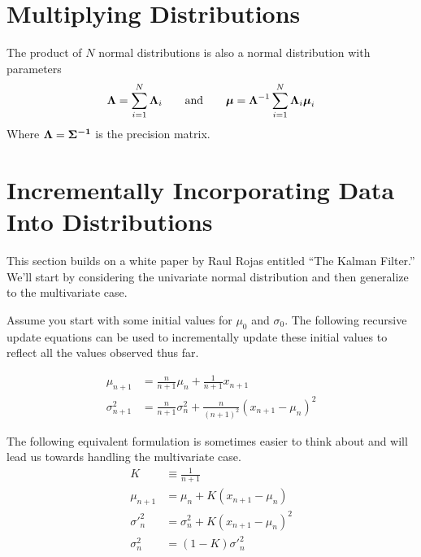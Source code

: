 \documentclass[../../main.tex]{subfiles}
\begin{document}
\section{Multiplying Distributions}
The product of $N$ normal distributions is also a normal distribution with
parameters
\begin{equation}
    \label{eq:sumnormalmuvar}
    \boldsymbol{\Lambda} = \sum\limits_{i=1}^{N}\boldsymbol{\Lambda}_i
    \qquad\text{and}\qquad
    \boldsymbol{\mu} = \boldsymbol{\Lambda}^{-1}\sum\limits_{i=1}^{N}\boldsymbol{\Lambda}_i\boldsymbol{\mu}_i
\end{equation}
Where $\boldsymbol{\Lambda} = \boldsymbol{\Sigma^{-1}}$ is the precision
matrix.


\section{Incrementally Incorporating Data Into Distributions}
This section builds on a white paper by Raul Rojas entitled ``The Kalman
Filter.''  We'll start by considering the univariate normal distribution
and then generalize to the multivariate case. 

Assume you start with some initial values for $\mu_0$ and $\sigma_0$.  The
following recursive update equations can be used to incrementally update these
initial values to reflect all the values observed thus far.

\begin{align}
    \label{eq:normalupdate1d}
    \mu_{n+1} &= \frac{n}{n + 1} \mu_n  + \frac{1}{n+1}x_{n+1} \\
    \sigma_{n+1}^2 &= \frac{n}{n + 1}\sigma_n^2
        + \frac{n}{(n+1)^2} \left( x_{n+1} - \mu_n \right) ^ 2\nonumber
\end{align}

The following equivalent formulation is sometimes easier to think
about and will lead us towards handling the multivariate case.
\begin{align}
    \label{eq:normalupdate1dwithgain}
    K &\equiv \frac{1}{n + 1}\\
    \mu_{n+1} &= \mu_n  + K \left( x_{n+1} - \mu_n \right)\nonumber\\
    {\sigma'}_n^2 &= \sigma_n^2 + K \left( x_{n+1} - \mu_n  \right)^2\nonumber\\
    \sigma_n^2 &= (1-K){\sigma'}_n^2\nonumber
\end{align}
\end{document}
